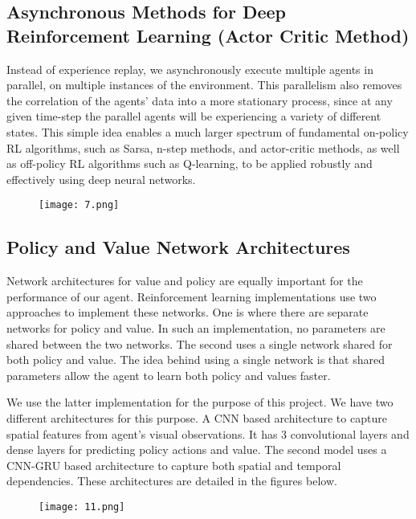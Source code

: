 \documentclass[conference]{IEEEtran}
\begin{document}
\subsection{\textbf{Asynchronous Methods for Deep Reinforcement Learning (Actor Critic Method)}}

Instead of experience replay, we asynchronously execute multiple agents in parallel, on multiple instances of the environment. This parallelism also removes the correlation of the agents’ data into a more stationary process, since at any given time-step the parallel agents will be experiencing a variety of different states. This simple idea enables a much larger spectrum of fundamental on-policy RL algorithms, such as Sarsa, n-step methods, and actor-critic methods, as well as off-policy RL algorithms such as Q-learning, to be applied robustly and effectively using deep neural networks.

\begin{figure}[htp]
    \centering
    \texttt{[image: 7.png]}
\end{figure}

\subsection{\textbf{Policy and Value Network Architectures}}

Network architectures for value and policy are equally important for the performance of our agent. Reinforcement learning implementations use two approaches to implement these networks. One is where there are separate networks for policy and value. In such an implementation, no parameters are shared between the two networks. The second uses a single network shared for both policy and value. The idea behind using a single network is that shared parameters allow the agent to learn both policy and values faster. 

We use the latter implementation for the purpose of this project. We have two different architectures for this purpose. A CNN based architecture to capture spatial features from agent’s visual observations. It has 3 convolutional layers and dense layers for predicting policy actions and value. The second model uses a CNN-GRU based architecture to capture both spatial and temporal dependencies. These architectures are detailed in the figures below. 

\begin{figure}[htp]
    \centering
    \texttt{[image: 11.png]}
\end{figure}
\end{document}
